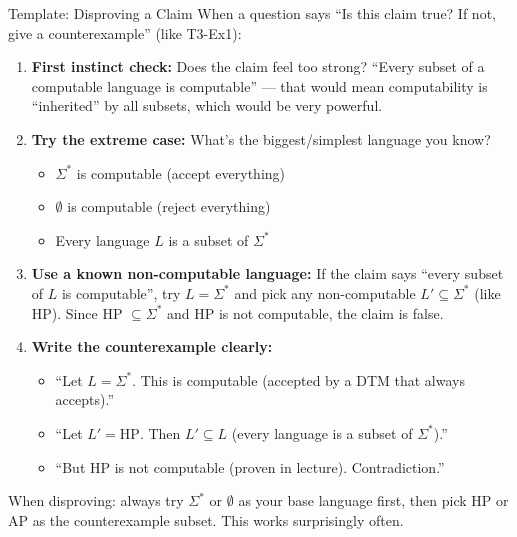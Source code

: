 \documentclass[11pt,a4paper]{article}
\newcommand{\keytakeaway}[1]{%
  \par\vspace{0.3em}%
  \colorbox{yellow!60}{\parbox{\dimexpr\linewidth-2\fboxsep}{#1}}%
  \vspace{0.3em}}
\begin{document}
\begin{templatebox}{Template: Disproving a Claim}
When a question says ``Is this claim true? If not, give a counterexample'' (like T3-Ex1):

\begin{enumerate}
    \item \textbf{First instinct check:} Does the claim feel too strong? ``Every subset of a computable language is computable'' --- that would mean computability is ``inherited'' by all subsets, which would be very powerful.

    \item \textbf{Try the extreme case:} What's the biggest/simplest language you know?
    \begin{itemize}
        \item $\Sigma^*$ is computable (accept everything)
        \item $\emptyset$ is computable (reject everything)
        \item Every language $L$ is a subset of $\Sigma^*$
    \end{itemize}

    \item \textbf{Use a known non-computable language:} If the claim says ``every subset of $L$ is computable'', try $L = \Sigma^*$ and pick any non-computable $L' \subseteq \Sigma^*$ (like HP). Since HP $\subseteq \Sigma^*$ and HP is not computable, the claim is false.

    \item \textbf{Write the counterexample clearly:}
    \begin{itemize}
        \item ``Let $L = \Sigma^*$. This is computable (accepted by a DTM that always accepts).''
        \item ``Let $L' = \text{HP}$. Then $L' \subseteq L$ (every language is a subset of $\Sigma^*$).''
        \item ``But HP is not computable (proven in lecture). Contradiction.''
    \end{itemize}
\end{enumerate}

\keytakeaway{When disproving: always try $\Sigma^*$ or $\emptyset$ as your base language first, then pick HP or AP as the counterexample subset. This works surprisingly often.}
\end{templatebox}

\newpage
\end{document}
